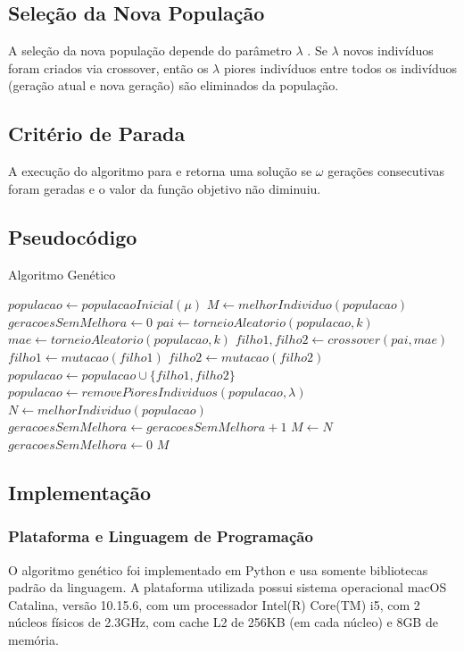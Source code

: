 \documentclass{article}
\begin{document}
\subsection{Seleção da Nova População}
A seleção da nova população depende do parâmetro $\lambda$ . Se $\lambda$ novos indivíduos foram criados via crossover, então os $\lambda$ piores indivíduos  entre todos os indivíduos (geração atual e nova geração) são eliminados da população.


\subsection{Critério de Parada}
A execução do algoritmo para e retorna uma solução se $\omega$ gerações consecutivas foram geradas e o valor da função objetivo não diminuiu.

\subsection{Pseudocódigo}
\begin{algorithm}[H]
\caption{Algoritmo Genético}
\begin{algorithmic}

\STATE $populacao \leftarrow populacaoInicial(\mu)$
\STATE $M \leftarrow melhorIndividuo(populacao)$
\STATE $geracoesSemMelhora \leftarrow 0$
\STATE $pai \leftarrow torneioAleatorio(populacao, k)$
\STATE $mae \leftarrow torneioAleatorio(populacao, k)$
\STATE $filho1, filho2 \leftarrow crossover(pai, mae)$
\STATE $filho1 \leftarrow mutacao(filho1)$
\ENDIF
{}
\STATE $filho2 \leftarrow mutacao(filho2)$
\ENDIF
\STATE $populacao \leftarrow populacao \cup \{filho1, filho2\}$
\ENDFOR
\STATE $populacao \leftarrow removePioresIndividuos(populacao, \lambda) $
\STATE $N \leftarrow melhorIndividuo(populacao)$
\STATE $geracoesSemMelhora \leftarrow geracoesSemMelhora + 1$
\ELSE
\STATE $M \leftarrow N$
\STATE $geracoesSemMelhora \leftarrow 0$
\ENDIF
\ENDWHILE
\RETURN $M$
\end{algorithmic}
\end{algorithm}


\subsection{Implementação}

\subsubsection{Plataforma e Linguagem de Programação}
O algoritmo genético foi implementado em Python e usa somente bibliotecas padrão da linguagem.  A plataforma utilizada possui sistema operacional macOS Catalina, versão 10.15.6, com um
processador Intel(R) Core(TM) i5, com 2 núcleos físicos de 2.3GHz, com cache L2 de 256KB (em cada núcleo) e 8GB de memória.
\end{document}
